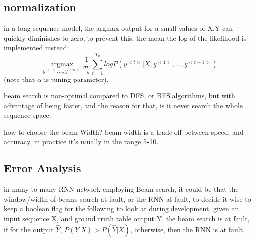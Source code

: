 \documentclass[4apaper,12pt]{book}
\begin{document}
\begin{description}
\begin{description}
\begin{description}
        \subsection{normalization}
        \begin{description}
        \item in a long sequence model, the argmax output for a small values of X,Y can quickly diminishes to zero, to prevent this, the mean the log of the likelihood is implemented instead: $$
          \underset{y^{<1>},\dots,y^{<T_Y>}}{\operatorname{argmax}}\frac{1}{T_y^{\alpha}}\sum_{t=1}^{T_y}logP(y^{<t>}|X,y^{<1>},\dots,y^{<t-1>})$$ (note that $\alpha$ is tuning parameter).
        \end{description}
        \item beam search is non-optimal compared to DFS, or BFS algorithms, but with advantage of being faster, and the reason for that, is it never search the whole sequence space.
        \item how to choose the beam Width? beam width is a trade-off between speed, and accuracy, in practice it's usually in the range 5\textbf{-}10.
          \subsection{Error Analysis}
          \begin{description}
          \item in many-to-many RNN network employing Beam search, it could be that the window/width of beams search at fault, or the RNN at fault, to decide it wise to keep a boolean flag for the following to look at during development, given an input sequence X, and ground truth table output Y, the beam search is at fault, if for the output $\hat{Y}$, $P(Y|X)>P(\hat{Y}|X)$, otherwise, then the RNN is at fault.
          \end{description}

\end{description}
\end{description}
\end{description}
\end{document}
